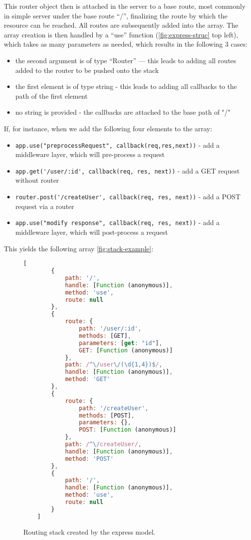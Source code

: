 This router object then is attached in the server to a base route, most commonly in  simple server under the base route “/”, finalizing the route by which the resource can be reached. All routes are subsequently added into the array. The array creation is then handled by a “use” function (\autoref{fig:express-struc} top left), which takes as many parameters as needed, which results in the following 3 cases:
\begin{itemize}
    \item  the second argument is of type “Router” — this leads to adding all routes added to the router to be pushed onto the stack
    \item  the first element is of type string - this leads to adding all callbacks to the path of the first element
    \item  no string is provided - the callbacks are attached to the base path of "/"
\end{itemize}
If, for instance, when we add the following four elements to the array:    
\begin{itemize}
    \item \lstinline{app.use("preprocessRequest", callback(req,res,next))} - add a middleware layer, which will pre-process a request
    \item \lstinline{app.get('/user/:id', callback(req, res, next))} - add a GET request without router
    \item \lstinline{router.post('/createUser', callback(req, res, next))} - add a POST request via a router
    \item \lstinline{app.use("modify response", callback(req, res, next))} - add a middleware layer, which will post-process a request
\end{itemize}
This yields the following array \autoref{fig:stack-example}:
\begin{figure}[ht]
	\begin{lstlisting}[language=JavaScript, gobble=4]
    [
        {
            path: '/',
            handle: [Function (anonymous)],
            method: 'use',
            route: null
        },
        {
            route: {
                path: '/user/:id',
                methods: [GET],
                parameters: [get: "id"],
                GET: [Function (anonymous)]
            },
            path: /^\/user\/(\d{1,4})$/,
            handle: [Function (anonymous)],
            method: 'GET'
        },
        {
            route: {
                path: '/createUser',
                methods: [POST],
                parameters: {},
                POST: [Function (anonymous)]
            },
            path: /^\/createUser/,
            handle: [Function (anonymous)],
            method: 'POST'
        },
        {
            path: '/',
            handle: [Function (anonymous)],
            method: 'use',
            route: null
        }
    ]
	\end{lstlisting}
	\caption{Routing stack created by the express model. }
	\label{fig:stack-example}
\end{figure}



